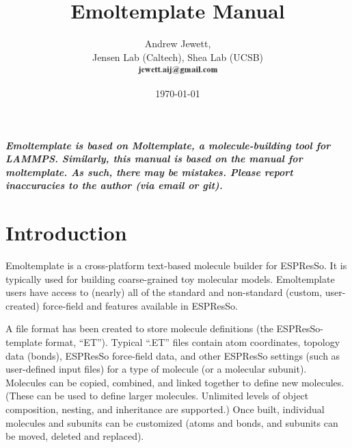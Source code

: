 \documentclass[11pt]{article}
\begin{document}
\author{
  Andrew Jewett, \\
  Jensen Lab (Caltech), Shea Lab (UCSB) \\
\includegraphics[height=0.3cm]{author_email.png}
}
\date \today


\title{Emoltemplate Manual}



\maketitle

  \textit{\textbf{Emoltemplate is based on Moltemplate, a molecule-building tool for LAMMPS.  Similarly, this manual is based on the manual for moltemplate.  As such, there may be mistakes.  Please report inaccuracies to the author (via email or git).}}

\tableofcontents


\section{Introduction}

 Emoltemplate is a cross-platform text-based molecule builder for ESPResSo. It is typically used for building coarse-grained toy molecular models. Emoltemplate users have access to (nearly) all of the standard and non-standard (custom, user-created) force-field and features available in ESPResSo.


A file format has been created to store molecule definitions (the ESPResSo-template format, ``ET''). Typical ``.ET'' files contain atom coordinates, topology data (bonds), ESPResSo force-field data, and other ESPResSo settings (such as user-defined input files) for a type of molecule (or a molecular subunit).  Molecules can be copied, combined, and linked together to define new molecules. (These can be used to define larger molecules. Unlimited levels of object composition, nesting, and inheritance are supported.) Once built, individual molecules and subunits can be customized (atoms and bonds, and subunits can be moved, deleted and replaced).
\end{document}

